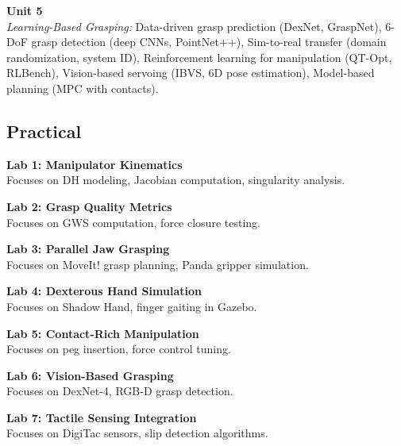 \vspace{0.3cm}

\noindent\textbf{Unit 5} \\
\textit{Learning-Based Grasping:} Data-driven grasp prediction (DexNet, GraspNet), 6-DoF grasp detection (deep CNNs, PointNet++), Sim-to-real transfer (domain randomization, system ID), Reinforcement learning for manipulation (QT-Opt, RLBench), Vision-based servoing (IBVS, 6D pose estimation), Model-based planning (MPC with contacts).

\newpage

\subsection*{Practical}
\noindent\textbf{Lab 1: Manipulator Kinematics} \\
Focuses on DH modeling, Jacobian computation, singularity analysis.

\vspace{0.2cm}

\noindent\textbf{Lab 2: Grasp Quality Metrics} \\
Focuses on GWS computation, force closure testing.

\vspace{0.2cm}

\noindent\textbf{Lab 3: Parallel Jaw Grasping} \\
Focuses on MoveIt! grasp planning, Panda gripper simulation.

\vspace{0.2cm}

\noindent\textbf{Lab 4: Dexterous Hand Simulation} \\
Focuses on Shadow Hand, finger gaiting in Gazebo.

\vspace{0.2cm}

\noindent\textbf{Lab 5: Contact-Rich Manipulation} \\
Focuses on peg insertion, force control tuning.

\vspace{0.2cm}

\noindent\textbf{Lab 6: Vision-Based Grasping} \\
Focuses on DexNet-4, RGB-D grasp detection.

\vspace{0.2cm}

\noindent\textbf{Lab 7: Tactile Sensing Integration} \\
Focuses on DigiTac sensors, slip detection algorithms.

